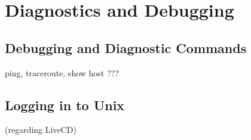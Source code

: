 %
%

\chapter{Diagnostics and Debugging}

\section{Debugging and Diagnostic Commands}

ping, traceroute, show host ???

\section{Logging in to Unix}

(regarding LiveCD)
